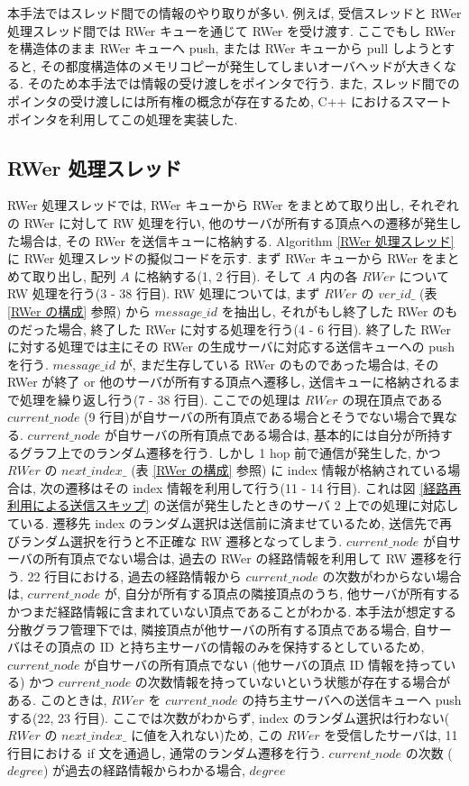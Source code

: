 本手法ではスレッド間での情報のやり取りが多い. 例えば, 受信スレッドと RWer 処理スレッド間では RWer キューを通じて RWer を受け渡す. ここでもし RWer を構造体のまま RWer キューへ push, または RWer キューから pull しようとすると, その都度構造体のメモリコピーが発生してしまいオーバヘッドが大きくなる. そのため本手法では情報の受け渡しをポインタで行う. また, スレッド間でのポインタの受け渡しには所有権の概念が存在するため, C++ におけるスマートポインタを利用してこの処理を実装した. 



\subsection{RWer 処理スレッド}

RWer 処理スレッドでは, RWer キューから RWer をまとめて取り出し, それぞれの RWer に対して RW 処理を行い, 他のサーバが所有する頂点への遷移が発生した場合は, その RWer を送信キューに格納する. Algorithm \ref{RWer 処理スレッド} に RWer 処理スレッドの擬似コードを示す. まず RWer キューから RWer をまとめて取り出し, 配列 $A$ に格納する(1, 2 行目). そして $A$ 内の各 $RWer$ について RW 処理を行う(3 - 38 行目). RW 処理については, まず $RWer$ の $ver\_id\_$ (表 \ref{RWer の構成} 参照) から $message\_id$ を抽出し, それがもし終了した RWer のものだった場合, 終了した RWer に対する処理を行う(4 - 6 行目). 終了した RWer に対する処理では主にその RWer の生成サーバに対応する送信キューへの push を行う. $message\_id$ が, まだ生存している RWer のものであった場合は, その RWer が終了 or 他のサーバが所有する頂点へ遷移し, 送信キューに格納されるまで処理を繰り返し行う(7 - 38 行目). ここでの処理は $RWer$ の現在頂点である $current\_node$ (9 行目)が自サーバの所有頂点である場合とそうでない場合で異なる. $current\_node$ が自サーバの所有頂点である場合は, 基本的には自分が所持するグラフ上でのランダム遷移を行う. しかし 1 hop 前で通信が発生した, かつ $RWer$ の $next\_index\_$ (表 \ref{RWer の構成} 参照) に index 情報が格納されている場合は, 次の遷移はその index 情報を利用して行う(11 - 14 行目). これは図 \ref{経路再利用による送信スキップ} の送信が発生したときのサーバ 2 上での処理に対応している. 遷移先 index のランダム選択は送信前に済ませているため, 送信先で再びランダム選択を行うと不正確な RW 遷移となってしまう. $current\_node$ が自サーバの所有頂点でない場合は, 過去の RWer の経路情報を利用して RW 遷移を行う. 22 行目における, 過去の経路情報から $current\_node$ の次数がわからない場合は, $current\_node$ が, 自分が所有する頂点の隣接頂点のうち, 他サーバが所有するかつまだ経路情報に含まれていない頂点であることがわかる. 本手法が想定する分散グラフ管理下では, 隣接頂点が他サーバの所有する頂点である場合, 自サーバはその頂点の ID と持ち主サーバの情報のみを保持するとしているため, $current\_node$ が自サーバの所有頂点でない (他サーバの頂点 ID 情報を持っている) かつ $current\_node$ の次数情報を持っていないという状態が存在する場合がある. このときは, $RWer$ を $current\_node$ の持ち主サーバへの送信キューへ push する(22, 23 行目). ここでは次数がわからず, index のランダム選択は行わない($RWer$ の $next\_index\_$ に値を入れない)ため, この $RWer$ を受信したサーバは, 11 行目における if 文を通過し, 通常のランダム遷移を行う. $current\_node$ の次数 ($degree$) が過去の経路情報からわかる場合, $degree$ 